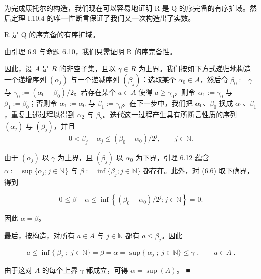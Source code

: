 为完成康托尔的构造，我们现在可以容易地证明 R 是 Q 的序完备的有序扩域。然后定理 I.10.4 的唯一性断言保证了我们又一次构造出了实数。

\begin{theorem}

R 是 Q 的序完备的有序扩域。

\proofhead
由引理 6.9 与命题 6.10，我们只需证明 R 的序完备性。

因此，设 $A$ 是 $R$ 的非空子集，且以 $\gamma \in R$ 为上界。我们按如下方式递归地构造一个递增序列 $(\alpha_j)$ 与一个递减序列 $(\beta_j)$：选取某个 $\alpha_0 \in A$，然后令 $\beta_0 := \gamma$ 与 $\gamma_0 := (\alpha_0 + \beta_0)/2$。若存在某个 $a \in A$ 使得 $a \geq \gamma_0$，则令 $\alpha_1 := \gamma_0$ 与 $\beta_1 := \beta_0$；否则令 $\alpha_1 := \alpha_0$ 与 $\beta_1 := \gamma_0$。在下一步中，我们把 $\alpha_0$、$\beta_0$ 换成 $\alpha_1$、$\beta_1$，重复上述过程以得到 $\alpha_2$ 与 $\beta_2$。迭代这一过程产生具有所断言性质的序列 $(\alpha_j)$ 与 $(\beta_j)$，并且
\begin{equation}
0<\beta_{j}-\alpha_{j}\leq(\beta_{0}-\alpha_{0})/2^{j},\qquad j\in\mathbb{N}.
\end{equation}

由于 $(\alpha_j)$ 以 $\gamma$ 为上界，且 $(\beta_j)$ 以 $\alpha_0$ 为下界，引理 6.12 蕴含 $\alpha := \sup\{\alpha_j; j \in \mathbb{N}\}$ 与 $\beta := \inf\{\beta_j; j \in \mathbb{N}\}$ 都存在。此外，对 (6.6) 取下确界，得到

\[
0\leq\beta-\alpha\leq\inf\left\{(\beta_{0}-\alpha_{0})/2^{j};j\in\mathbb{N}\right\}=0.
\]

因此  $ \alpha = \beta $。

最后，按构造，对所有  $ a \in A $ 与  $ j \in \mathbb{N} $ 都有  $ a \leq \beta_j $。因此

\[
a\leq\operatorname*{i n f}\{\;\beta_{j}\;;\;j\in\mathbb{N}\}\nonumber=\beta=\alpha=\operatorname*{s u p}\{\;\alpha_{j}\;;\;j\in\mathbb{N}\}\nonumber\leq\gamma\;,\qquad a\in A\;.
\]

由于这对  $ A $ 的每个上界  $ \gamma $ 都成立，可得  $ \alpha = \sup(A) $。 ■

\end{theorem}

\exerciseshead

